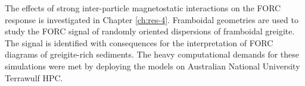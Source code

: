 The effects of strong inter-particle magnetostatic interactions on the FORC response is investigated in Chapter \ref{ch:res-4}. Framboidal geometries are used to study the FORC signal of randomly oriented dispersions of framboidal greigite. The signal is identified with consequences for the interpretation of FORC diagrams of greigite-rich sediments. The heavy computational demands for these simulations were met by deploying the models on Australian National University Terrawulf HPC.\par

%
%

